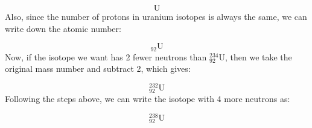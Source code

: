 {\begin{mdframed}[linewidth=4, leftmargin=40, rightmargin=40]
\begin{exercise}
\begin{enumerate}[noitemsep, label=\textbf{Step} \textbf{\arabic*}. ]
    \begin{equation}
    \mathrm{U}\tag{3.2}
      \end{equation}
        \label{m38753*id257657}Also, since the number of protons in uranium isotopes is always the same, we can write
down the atomic number:\par 
        \label{m38753*id257664}\nopagebreak\noindent{}
          
    \begin{equation}
    {}_{92}\mathrm{U}\tag{3.3}
      \end{equation}
        \label{m38753*id257684}Now, if the isotope we want has 2 fewer neutrons than $_{92}^{234}\mathrm{U}$,
then we take the original mass number and subtract 2, which gives:\par 
        \label{m38753*id257713}\nopagebreak\noindent{}
          
    \begin{equation}
    _{92}^{232}\mathrm{U}\tag{3.4}
      \end{equation}
        \label{m38753*id257736}Following the steps above, we can write the isotope with 4 more neutrons as:\par 
        \label{m38753*id257740}\nopagebreak\noindent{}
          
    \begin{equation}
    _{92}^{238}\mathrm{U}\tag{3.5}
      \end{equation}
 \end{enumerate}
    \end{exercise}
    \end{mdframed}
    }
    \noindent
\par
            \label{m38753*secfhsst!!!underscore!!!id466}\vspace{.5cm} 
      \noindent
